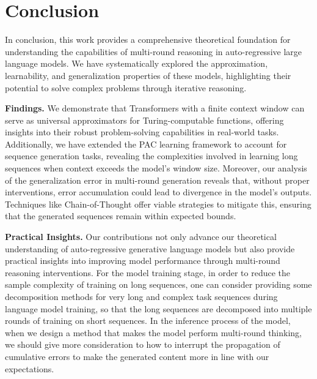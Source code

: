\section{Conclusion}\label{section7}


In conclusion, this work provides a comprehensive theoretical foundation for understanding the capabilities of multi-round reasoning in auto-regressive large language models. We have systematically explored the approximation, learnability, and generalization properties of these models, highlighting their potential to solve complex problems through iterative reasoning. 

\textbf{Findings.} We demonstrate that Transformers with a finite context window can serve as universal approximators for Turing-computable functions, offering insights into their robust problem-solving capabilities in real-world tasks. Additionally, we have extended the PAC learning framework to account for sequence generation tasks, revealing the complexities involved in learning long sequences when context exceeds the model's window size. 
Moreover, our analysis of the generalization error in multi-round generation reveals that, without proper interventions, error accumulation could lead to divergence in the model's outputs. Techniques like Chain-of-Thought offer viable strategies to mitigate this, ensuring that the generated sequences remain within expected bounds. 

\textbf{Practical Insights.} Our contributions not only advance our theoretical understanding of auto-regressive generative language models but also provide practical insights into improving model performance through multi-round reasoning interventions. 
 For the model training stage, in order to reduce the sample complexity of training on long sequences, one can consider providing some decomposition methods for very long and complex task sequences during language model training, so that the long sequences are decomposed into multiple rounds of training on short sequences. In the inference process of the model, when we design a method that makes the model perform multi-round thinking, we should give more consideration to how to interrupt the propagation of cumulative errors to make the generated content more in line with our expectations.